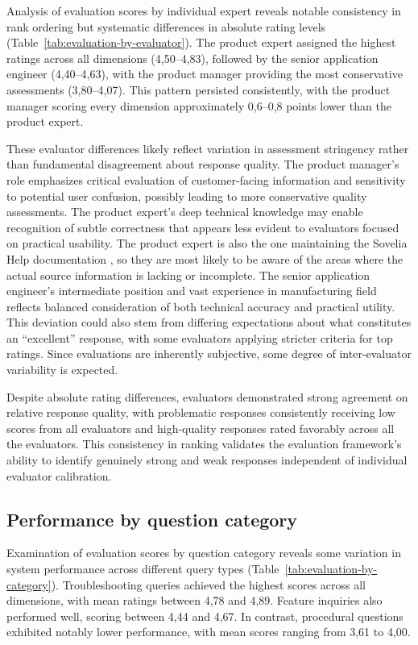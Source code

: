 Analysis of evaluation scores by individual expert reveals notable consistency in rank ordering but systematic differences in absolute rating levels (Table~\ref{tab:evaluation-by-evaluator}). The product expert assigned the highest ratings across all dimensions (4,50--4,83), followed by the senior application engineer (4,40--4,63), with the product manager providing the most conservative assessments (3,80--4,07). This pattern persisted consistently, with the product manager scoring every dimension approximately 0,6--0,8 points lower than the product expert.

These evaluator differences likely reflect variation in assessment stringency rather than fundamental disagreement about response quality. The product manager's role emphasizes critical evaluation of customer-facing information and sensitivity to potential user confusion, possibly leading to more conservative quality assessments. The product expert's deep technical knowledge may enable recognition of subtle correctness that appears less evident to evaluators focused on practical usability. The product expert is also the one maintaining the Sovelia Help documentation \parencite{SoveliaHelp}, so they are most likely to be aware of the areas where the actual source information is lacking or incomplete. The senior application engineer's intermediate position and vast experience in manufacturing field reflects balanced consideration of both technical accuracy and practical utility. This deviation could also stem from differing expectations about what constitutes an ``excellent'' response, with some evaluators applying stricter criteria for top ratings. Since evaluations are inherently subjective, some degree of inter-evaluator variability is expected.

Despite absolute rating differences, evaluators demonstrated strong agreement on relative response quality, with problematic responses consistently receiving low scores from all evaluators and high-quality responses rated favorably across all the evaluators. This consistency in ranking validates the evaluation framework's ability to identify genuinely strong and weak responses independent of individual evaluator calibration.

\subsection{Performance by question category}
\label{subsec:performance-by-category}

Examination of evaluation scores by question category reveals some variation in system performance across different query types (Table~\ref{tab:evaluation-by-category}). Troubleshooting queries achieved the highest scores across all dimensions, with mean ratings between 4,78 and 4,89. Feature inquiries also performed well, scoring between 4,44 and 4,67. In contrast, procedural questions exhibited notably lower performance, with mean scores ranging from 3,61 to 4,00.

